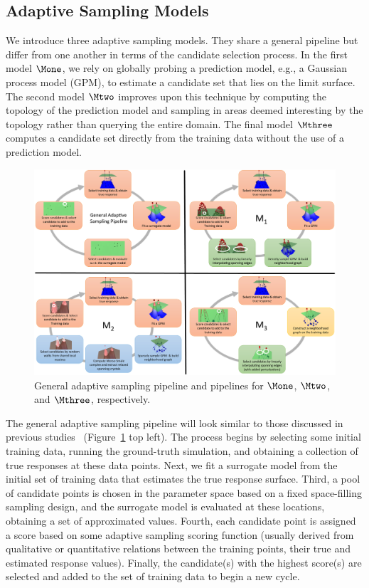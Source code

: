 \subsection{Adaptive Sampling Models}
\label{sec:pipelines}

We introduce three adaptive sampling models.
%
They share a general pipeline but differ from one another in terms of the candidate selection process.
%
In the first model $\Mone$, we rely on globally probing a prediction model, e.g., a Gaussian process model (GPM), to estimate a candidate set that lies on the limit surface.
%
The second model $\Mtwo$ improves upon this technique by computing the topology of the prediction model and sampling in areas deemed interesting by the topology rather than querying the entire domain.
%
The final model $\Mthree$ computes a candidate set directly from the training data without the use of a prediction model.

\begin{figure}[!ht]
\centering
\includegraphics[width=1.0\textwidth]{figs/chap5/pipelines}
\caption[Limit surface adaptive sampling pipelines]{General adaptive sampling pipeline and pipelines for $\protect\Mone$, $\protect\Mtwo$, and $\protect\Mthree$, respectively.}
\label{fig:pipelines}
\end{figure}

The general adaptive sampling pipeline will look similar to those discussed in previous studies~\cite{MaljovecWangKupresanin2013} (Figure~\ref{fig:pipelines} top left).
%
The process begins by selecting some initial training data, running the ground-truth simulation, and obtaining a collection of true responses at these data points.
%
Next, we fit a surrogate model from the initial set of training data that estimates the true response surface.
%
Third, a pool of candidate points is chosen in the parameter space based on a fixed space-filling sampling design, and the surrogate model is evaluated at these locations, obtaining a set of approximated values.
%
Fourth, each candidate point is assigned a score based on some adaptive sampling scoring function (usually derived from qualitative or quantitative relations between the training points, their true and estimated response values).
%
Finally, the candidate(s) with the highest score(s) are selected and added to the set of training data to begin a new cycle.

